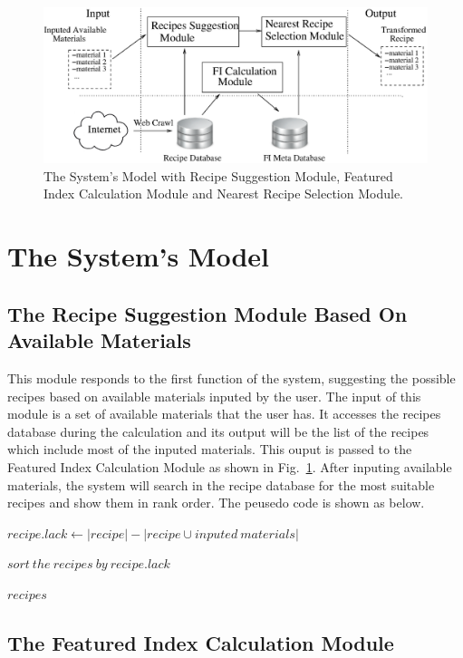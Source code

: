 \begin{figure}[ht]
\centering
\includegraphics[scale=0.8]{system.eps} 
\caption{The System's Model with Recipe Suggestion Module, Featured Index Calculation Module and Nearest Recipe Selection Module.}
\label{fig:system-model}
\end{figure}

\section{The System's Model}

\subsection{The Recipe Suggestion Module Based On Available Materials}

This module responds to the first function of the system, suggesting the possible recipes based on available materials inputed by the user. The input of this module is a set of available materials that the user has. It accesses the recipes database during the calculation and its output will be the list of the recipes which include most of the inputed materials. This ouput is passed to the Featured Index Calculation Module as shown in Fig.~\ref{fig:system-model}. After inputing available materials, the system will search in the recipe database for the most suitable recipes and show them in rank order. The peusedo code is shown as below. 

\begin{algorithmic}

\State $recipe.lack \gets |recipe| - |recipe \cup inputed\ materials|$
\EndFor

\State $sort\ the\ recipes\ by\ recipe.lack$

\Return $recipes$

\end{algorithmic}


\subsection{The Featured Index Calculation Module}

